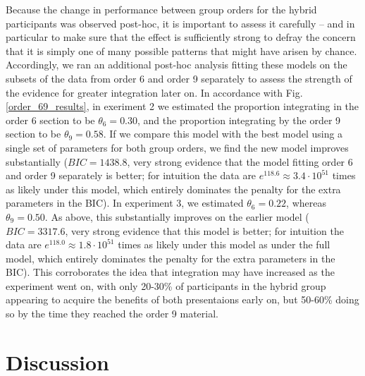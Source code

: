 \documentclass[man,10pt]{apa6}
\begin{document}
Because the change in performance between group orders for the hybrid participants was observed post-hoc, it is important to assess it carefully -- and in particular to make sure that the effect is sufficiently strong to defray the concern that it is simply one of many possible patterns that might have arisen by chance. Accordingly, we ran an additional post-hoc analysis fitting these models on the subsets of the data from order 6 and order 9 separately to assess the strength of the evidence for greater integration later on. In accordance with Fig. \ref{order_69_results}, in exeriment 2 we estimated the proportion integrating in the order 6 section to be $\theta_6 = 0.30$, and the proportion integrating by the order 9 section to be $\theta_9 = 0.58$. If we compare this model with the best model using a single set of parameters for both group orders, we find the new model improves substantially ($BIC = 1438.8$, very strong evidence that the model fitting order 6 and order 9 separately is better; for intuition the data are $e^{118.6} \approx 3.4 \cdot 10^{51}$ times as likely under this model, which entirely dominates the penalty for the extra parameters in the BIC). In experiment 3, we estimated $\theta_6 = 0.22$, whereas $\theta_9 = 0.50$. As above, this substantially improves on the earlier model ($BIC=3317.6$, very strong evidence that this model is better; for intuition the data are $e^{118.0} \approx 1.8 \cdot 10^{51}$ times as likely under this model as under the full model, which entirely dominates the penalty for the extra parameters in the BIC). This corroborates the idea that integration may have increased as the experiment went on, with only 20-30\% of participants in the hybrid group appearing to acquire the benefits of both presentaions early on, but 50-60\% doing so by the time they reached the order 9 material.
\section{Discussion}
\end{document}
